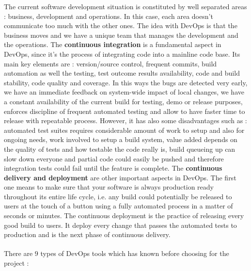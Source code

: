 The current software development situation is constituted by well separated areas : business, development and operations. In this case, each area doesn't communicate too much with the other ones. The idea with DevOps is that the business moves and we have a unique team that manages the development and the operations. The \textbf{continuous integration} is a fundamental aspect in DevOps, since it's the process of integrating code into a mainline code base. Its main key elements are : version/source control, frequent commits, build automation as well the testing, test outcome results availability, code and build stability, code quality and coverage. In this ways the bugs are detected very early, we have an immediate feedback on system-wide impact of local changes, we have a constant availability of the current build for testing, demo or release purposes, enforces discipline of frequent automated testing and allow to have faster time to release with repeatable process. However, it has also some disadvantages such as : automated test suites requires considerable amount of work to setup and also for ongoing needs, work involved to setup a build system, value added depends on the quality of tests and how testable the code really is, build queueing up can slow down everyone and partial code could easily be pushed and therefore integration tests could fail until the feature is complete. The \textbf{continuous delivery and deployment} are other important aspects in DevOps. The first one means to make sure that your software is always production ready throughout its entire life cycle, i.e. any build could potentially be released to users at the touch of a button using a fully automated process in a matter of seconds or minutes. The continuous deployment is the practice of releasing every good build to users. It deploy every change that passes the automated tests to production and is the next phase of continuous delivery.\\\\There are $9$ types of DevOps tools which has known before choosing for the project :
